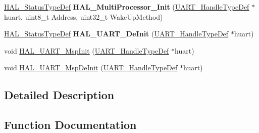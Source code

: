 \begin{DoxyCompactItemize}
\mbox{\hyperlink{stm32f7xx__hal__def_8h_a63c0679d1cb8b8c684fbb0632743478f}{H\+A\+L\+\_\+\+Status\+Type\+Def}} {\bfseries H\+A\+L\+\_\+\+Multi\+Processor\+\_\+\+Init} (\mbox{\hyperlink{group___u_a_r_t___exported___types_ga7adf4f3e4c3ecde572be5925c915a967}{U\+A\+R\+T\+\_\+\+Handle\+Type\+Def}} $\ast$huart, uint8\+\_\+t Address, uint32\+\_\+t Wake\+Up\+Method)
\item 
\mbox{\label{group___u_a_r_t___exported___functions___group1_ga8d98eaab25e61ae12e2e240c3388c57b}} 
\mbox{\hyperlink{stm32f7xx__hal__def_8h_a63c0679d1cb8b8c684fbb0632743478f}{H\+A\+L\+\_\+\+Status\+Type\+Def}} {\bfseries H\+A\+L\+\_\+\+U\+A\+R\+T\+\_\+\+De\+Init} (\mbox{\hyperlink{group___u_a_r_t___exported___types_ga7adf4f3e4c3ecde572be5925c915a967}{U\+A\+R\+T\+\_\+\+Handle\+Type\+Def}} $\ast$huart)
\item 
void \mbox{\hyperlink{group___u_a_r_t___exported___functions___group1_ga0e553b32211877322f949b14801bbfa7}{H\+A\+L\+\_\+\+U\+A\+R\+T\+\_\+\+Msp\+Init}} (\mbox{\hyperlink{group___u_a_r_t___exported___types_ga7adf4f3e4c3ecde572be5925c915a967}{U\+A\+R\+T\+\_\+\+Handle\+Type\+Def}} $\ast$huart)
\item 
void \mbox{\hyperlink{group___u_a_r_t___exported___functions___group1_ga718f39804e3b910d738a0e1e46151188}{H\+A\+L\+\_\+\+U\+A\+R\+T\+\_\+\+Msp\+De\+Init}} (\mbox{\hyperlink{group___u_a_r_t___exported___types_ga7adf4f3e4c3ecde572be5925c915a967}{U\+A\+R\+T\+\_\+\+Handle\+Type\+Def}} $\ast$huart)
\end{DoxyCompactItemize}


\subsection{Detailed Description}


\subsection{Function Documentation}
\mbox{\label{group___u_a_r_t___exported___functions___group1_ga718f39804e3b910d738a0e1e46151188}} 
